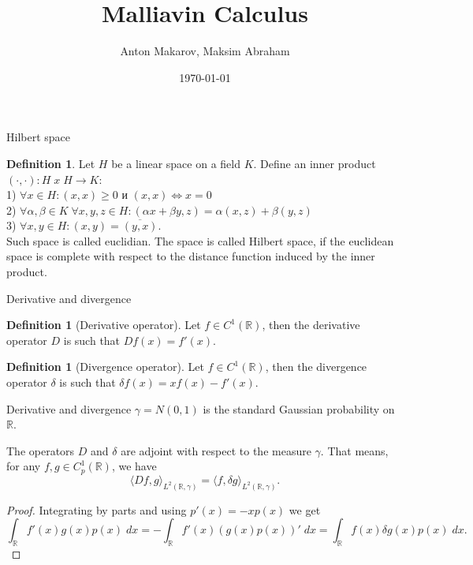 \documentclass{beamer}%
\title{Malliavin Calculus}
\author[A. Makarov, M. Abraham]{Anton Makarov, Maksim Abraham}
\institute[HSE FES Probability Theory Club]{HSE FES Probability Theory Club}
\date{\today}
\theoremstyle{definition}
\newtheorem{mydef}[theorem]{Definition}
\begin{document}

\begin{frame}
\titlepage
\end{frame}


\begin{frame}{Hilbert space}
\begin{mydef}
Let $H$ be a linear space on a field $K$. Define an inner product $(\cdot, \cdot): H\; x\; H \rightarrow K$: \\
1) $\forall x \in H: (x, x) \geq 0$ и $(x, x) \iff x = 0$ \\
2) $\forall \alpha, \beta \in K\; \forall x, y, z \in H: (\alpha x + \beta y, z) = \alpha (x, z) + \beta (y, z)$ \\
3) $\forall x, y \in H: (x, y) = \overline{(y, x)}$. \\
Such space is called euclidian. The space is called Hilbert space, if the euclidean space is complete with respect to the distance function induced by the inner product.
\end{mydef}

\end{frame}

\begin{frame}{Derivative and divergence}
\begin{mydef}[Derivative operator]
Let $f \in C^1 (\mathbb{R})$, then the derivative operator $D$ is such that $Df(x) = f'(x)$. 
\end{mydef}
\begin{mydef}[Divergence operator]
Let $f \in C^1 (\mathbb{R})$, then the divergence operator $\delta$ is such that $\delta f(x) = xf(x) - f'(x)$. 
\end{mydef}

\end{frame}


\begin{frame}{Derivative and divergence}
$\gamma = N(0, 1)$ is the standard Gaussian probability on $\mathbb{R}$.
\begin{lemma}
The operators $D$ and $\delta$ are adjoint with respect to the measure $\gamma$. That means, for any $f, g \in C_p^1(\mathbb{R})$, we have
$$
\langle Df, g\rangle_{L^2(\mathbb{R}, \gamma)} = \langle f, \delta g\rangle_{L^2(\mathbb{R}, \gamma)}.
$$
\end{lemma}
\begin{proof}
Integrating by parts and using $p'(x) = -xp(x)$ we get
$$
\int_{\mathbb{R}} f'(x)g(x)p(x)\; dx = - \int_{\mathbb{R}} f'(x) (g(x)p(x))'\; dx =
\int_{\mathbb{R}} f(x) \delta g(x)p(x)\; dx.
$$
\end{proof}

\end{frame}
\end{document}
